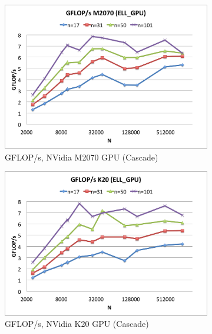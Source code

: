 \documentclass{report}
\begin{document}
\begin{figure} 
\centering
\begin{subfigure}[t]{0.48\textwidth}
\centering
\includegraphics[width=\textwidth]{gpu_content/cascade_spmv/ell_comparison_cascade_m2070.png}
\caption{GFLOP/s, NVidia M2070 GPU (Cascade)}
\label{fig:ell_gflops_cascade_m2070}
\end{subfigure}
\quad
\begin{subfigure}[t]{0.48\textwidth}
\centering
\includegraphics[width=\textwidth]{gpu_content/cascade_spmv/ell_comparison_cascade_k20.png}
\caption{GFLOP/s, NVidia K20 GPU (Cascade)}
\label{fig:ell_gflops_cascade_k20}
\end{subfigure}
\begin{subfigure}[t]{0.48\textwidth}
\centering

\end{subfigure}
\end{figure}
\end{document}
